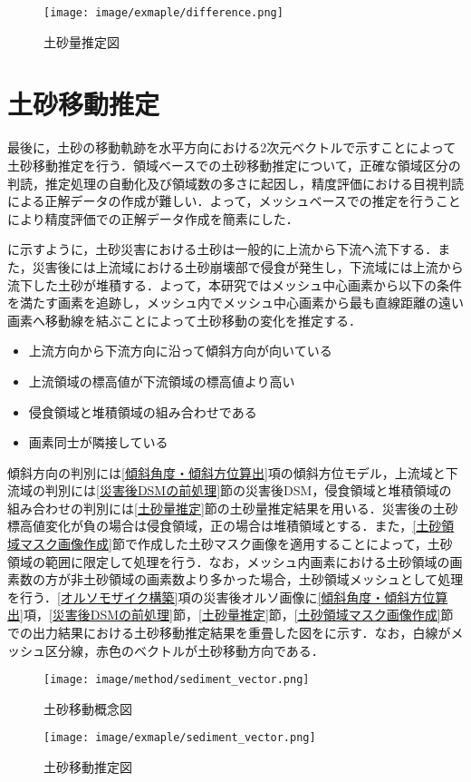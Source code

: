     \begin{figure}[tbp]
      \centering
      \texttt{[image: image/exmaple/difference.png]}
      \caption{土砂量推定図}
      \label{土砂量推定結果}
    \end{figure}



  \section{土砂移動推定}
    \label{土砂移動推定}
    最後に，土砂の移動軌跡を水平方向における2次元ベクトルで示すことによって土砂移動推定を行う．領域ベースでの土砂移動推定について，正確な領域区分の判読，推定処理の自動化及び領域数の多さに起因し，精度評価における目視判読による正解データの作成が難しい．よって，メッシュベースでの推定を行うことにより精度評価での正解データ作成を簡素にした．

    に示すように，土砂災害における土砂は一般的に上流から下流へ流下する．また，災害後には上流域における土砂崩壊部で侵食が発生し，下流域には上流から流下した土砂が堆積する\cite{土砂量解析5}．よって，本研究ではメッシュ中心画素から以下の条件を満たす画素を追跡し，メッシュ内でメッシュ中心画素から最も直線距離の遠い画素へ移動線を結ぶことによって土砂移動の変化を推定する．

    \begin{itemize}
      \setlength{\itemsep}{-5pt}
      \item 上流方向から下流方向に沿って傾斜方向が向いている
      \item 上流領域の標高値が下流領域の標高値より高い
      \item 侵食領域と堆積領域の組み合わせである
      \item 画素同士が隣接している
    \end{itemize}

    傾斜方向の判別には\ref{傾斜角度・傾斜方位算出}項の傾斜方位モデル，上流域と下流域の判別には\ref{災害後DSMの前処理}節の災害後DSM，侵食領域と堆積領域の組み合わせの判別には\ref{土砂量推定}節の土砂量推定結果を用いる．災害後の土砂標高値変化が負の場合は侵食領域，正の場合は堆積領域とする．また，\ref{土砂領域マスク画像作成}節で作成した土砂マスク画像を適用することによって，土砂領域の範囲に限定して処理を行う．なお，メッシュ内画素における土砂領域の画素数の方が非土砂領域の画素数より多かった場合，土砂領域メッシュとして処理を行う．\ref{オルソモザイク構築}項の災害後オルソ画像に\ref{傾斜角度・傾斜方位算出}項，\ref{災害後DSMの前処理}節，\ref{土砂量推定}節，\ref{土砂領域マスク画像作成}節での出力結果における土砂移動推定結果を重畳した図をに示す．なお，白線がメッシュ区分線，赤色のベクトルが土砂移動方向である．
    
    \begin{figure}[tbp]
      \centering
      \texttt{[image: image/method/sediment\_vector.png]}
      \caption{土砂移動概念図}
      \label{土砂移動概念図}
    \end{figure}

    \begin{figure}[tbp]
      \centering
      \texttt{[image: image/exmaple/sediment\_vector.png]}
      \caption{土砂移動推定図}
      \label{土砂移動推定結果}
    \end{figure}
